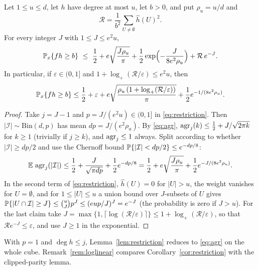 \begin{corollary}\label{cor:restriction}
Let $1\le u\le d$, let $h$ have degree at most $u$, let $b>0$, and put
$\rho_u=u/d$ and
\[
 \mathcal R=\frac1{b^2}\sum_{U\ne\emptyset}\widehat h(U)^2 .
\]
For every integer $J$ with $1\le J\le e^2u$,
\begin{equation}\label{eq:restriction-explicit}
 \mathbb P_x\{fh\ge b\}\ \le\ \frac12+e\sqrt{\frac{J\rho_u}\pi}
 +\frac12\exp\Bigl(-\frac J{8e^2\rho_u}\Bigr)+\mathcal R\,e^{-J}.
\end{equation}
In particular, if $\varepsilon\in(0,1]$ and
$1+\log_+(\mathcal R/\varepsilon)\le e^2u$, then
\[
 \mathbb P_x\{fh\ge b\}\le\frac12+\varepsilon
 +e\sqrt{\frac{\rho_u\,(1+\log_+(\mathcal R/\varepsilon))}\pi}
 +\frac12e^{-1/(8e^2\rho_u)} .
\]
\end{corollary}
\begin{proof}
Take $j=J-1$ and $p=J/(e^2u)\in(0,1]$ in \eqref{eq:restriction}. Then
$|\mathcal I|\sim\mathrm{Bin}(d,p)$ has mean $dp=J/(e^2\rho_u)$. By
\eqref{eq:agr}, $\operatorname{agr}_j(k)\le\frac12+J/\sqrt{2\pi k}$ for $k\ge1$ (trivially
if $j\ge k$), and $\operatorname{agr}_j\le1$ always. Split according to whether
$|\mathcal I|\ge dp/2$ and use the Chernoff bound
$\mathbb P\{|\mathcal I|<dp/2\}\le e^{-dp/8}$:
\[
 \mathbb E\,\operatorname{agr}_j(|\mathcal I|)\le\frac12+\frac J{\sqrt{\pi dp}}
 +\frac12e^{-dp/8}
 =\frac12+e\sqrt{\frac{J\rho_u}\pi}+\frac12e^{-J/(8e^2\rho_u)}.
\]
In the second term of \eqref{eq:restriction}, $\widehat h(U)=0$ for
$|U|>u$, the weight vanishes for $U=\emptyset$, and for $1\le|U|\le u$ a
union bound over $J$-subsets of $U$ gives
$\mathbb P\{|U\cap\mathcal I|\ge J\}\le\binom uJp^J\le(eup/J)^J=e^{-J}$ (the
probability is zero if $J>u$). For the last claim take
$J=\max\{1,\lceil\log(\mathcal R/\varepsilon)\rceil\}
\le1+\log_+(\mathcal R/\varepsilon)$, so that
$\mathcal Re^{-J}\le\varepsilon$, and use $J\ge1$ in the exponential.
\end{proof}

With $p=1$ and $\deg h\le j$, Lemma~\ref{lem:restriction} reduces to
\eqref{eq:agr} on the whole cube. Remark~\ref{rem:loglinear} compares
Corollary~\ref{cor:restriction} with the clipped-parity lemma.

